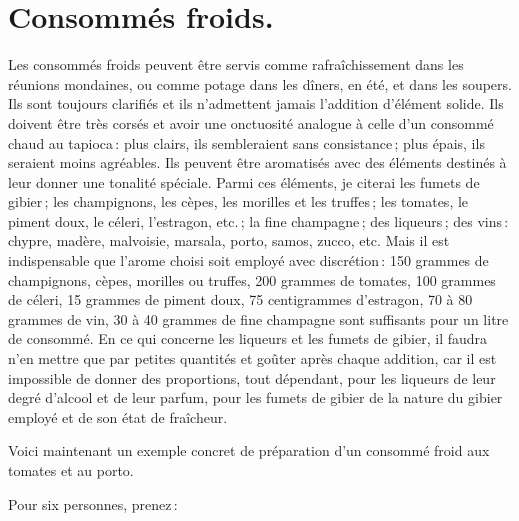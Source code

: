 \section*{\centering Consommés froids.}

Les consommés froids peuvent être servis comme rafraîchissement dans les
réunions mondaines, ou comme potage dans les dîners, en été, et dans les
soupers. Ils sont toujours clarifiés et ils n'admettent jamais l'addition
d'élément solide. Ils doivent être très corsés et avoir une onctuosité analogue
à celle d'un consommé chaud au tapioca : plus clairs, ils sembleraient sans
consistance ; plus épais, ils seraient moins agréables. Ils peuvent être
aromatisés avec des éléments destinés à leur donner une tonalité spéciale.
Parmi ces éléments, je citerai les fumets de gibier ; les champignons, les
cèpes, les morilles et les truffes ; les tomates, le piment doux, le céleri,
l’estragon, etc. ; la fine champagne ; des liqueurs ; des vins : chypre,
madère, malvoisie, marsala, porto, samos, zucco, etc. Mais il est indispensable
que l’arome choisi soit employé avec discrétion : 150 grammes de champignons,
cèpes, morilles ou truffes, 200 grammes de tomates, 100 grammes de céleri, 15
grammes de piment doux, 75 centigrammes d'estragon, 70 à 80 grammes de vin, 30
à 40 grammes de fine champagne sont suffisants pour un litre de consommé. En ce
qui concerne les liqueurs et les fumets de gibier, il faudra n'en mettre que
par petites quantités et goûter après chaque addition, car il est impossible de
donner des proportions, tout dépendant, pour les liqueurs de leur degré
d'alcool et de leur parfum, pour les fumets de gibier de la nature du gibier
employé et de son état de fraîcheur.

\sk

Voici maintenant un exemple concret de préparation d'un consommé froid aux
tomates et au porto.                                     

Pour six personnes, prenez :

